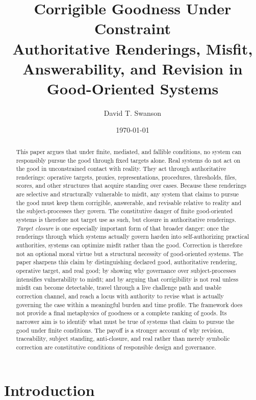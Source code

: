 \documentclass[11pt]{article}
\title{\textbf{Corrigible Goodness Under Constraint}\\
\large Authoritative Renderings, Misfit, Answerability, and Revision in Good-Oriented Systems}
\author{David T. Swanson}
\date{\today}
\renewcommand{\emph}[1]{\textit{#1}}
\begin{document}
\maketitle

\begin{abstract}
This paper argues that under finite, mediated, and fallible conditions, no system can responsibly pursue the good through fixed targets alone. Real systems do not act on the good in unconstrained contact with reality. They act through authoritative renderings: operative targets, proxies, representations, procedures, thresholds, files, scores, and other structures that acquire standing over cases. Because these renderings are selective and structurally vulnerable to misfit, any system that claims to pursue the good must keep them corrigible, answerable, and revisable relative to reality and the subject-processes they govern. The constitutive danger of finite good-oriented systems is therefore not target use as such, but closure in authoritative renderings. \emph{Target closure} is one especially important form of that broader danger: once the renderings through which systems actually govern harden into self-authorizing practical authorities, systems can optimize misfit rather than the good. Correction is therefore not an optional moral virtue but a structural necessity of good-oriented systems. The paper sharpens this claim by distinguishing declared good, authoritative rendering, operative target, and real good; by showing why governance over subject-processes intensifies vulnerability to misfit; and by arguing that corrigibility is not real unless misfit can become detectable, travel through a live challenge path and usable correction channel, and reach a locus with authority to revise what is actually governing the case within a meaningful burden and time profile. The framework does not provide a final metaphysics of goodness or a complete ranking of goods. Its narrower aim is to identify what must be true of systems that claim to pursue the good under finite conditions. The payoff is a stronger account of why revision, traceability, subject standing, anti-closure, and real rather than merely symbolic correction are constitutive conditions of responsible design and governance.
\end{abstract}

\pagebreak
\section{Introduction}
\end{document}
